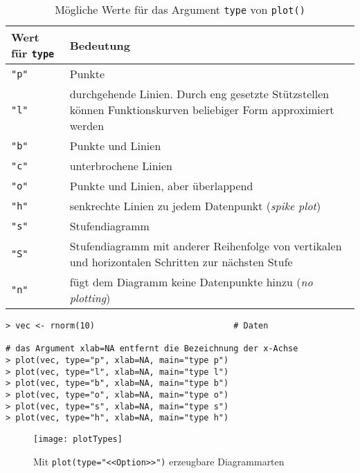 \begin{table}[ht]
\centering
\caption{Mögliche Werte für das Argument \lstinline!type! von \lstinline!plot()!}
\label{tab:plotArgs}
\begin{tabular}{p{2.3cm}p{10.2cm}}
\hline
\sffamily Wert für \lstinline!type! & \sffamily Bedeutung\\\hline\hline
\lstinline!"p"! & Punkte\\
\lstinline!"l"! & durchgehende Linien. Durch eng gesetzte Stützstellen können Funktionskurven beliebiger Form approximiert werden\\
\lstinline!"b"! & Punkte und Linien\\
\lstinline!"c"! & unterbrochene Linien\\
\lstinline!"o"! & Punkte und Linien, aber überlappend\\
\lstinline!"h"! & senkrechte Linien zu jedem Datenpunkt (\emph{spike plot})\\
\lstinline!"s"! & Stufendiagramm\\
\lstinline!"S"! & Stufendiagramm mit anderer Reihenfolge von vertikalen und horizontalen Schritten zur nächsten Stufe\\
\lstinline!"n"! & fügt dem Diagramm keine Datenpunkte hinzu (\emph{no plotting})\\\hline
\end{tabular}
\end{table}

\begin{lstlisting}
> vec <- rnorm(10)                            # Daten

# das Argument xlab=NA entfernt die Bezeichnung der x-Achse
> plot(vec, type="p", xlab=NA, main="type p")
> plot(vec, type="l", xlab=NA, main="type l")
> plot(vec, type="b", xlab=NA, main="type b")
> plot(vec, type="o", xlab=NA, main="type o")
> plot(vec, type="s", xlab=NA, main="type s")
> plot(vec, type="h", xlab=NA, main="type h")
\end{lstlisting}

\begin{figure}[ht]
\centering
\texttt{[image: plotTypes]}
\vspace*{-1em}
\caption{Mit \lstinline!plot(type="<<Option>>")! erzeugbare Diagrammarten}
\label{fig:plotTypes}
\end{figure}

